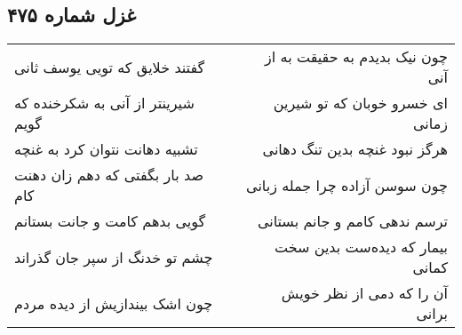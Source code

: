 \begin{center}
\section*{غزل شماره ۴۷۵}
\label{sec:sh475}
\begin{longtable}{l p{0.5cm} r}
گفتند خلایق که تویی یوسف ثانی
&&
چون نیک بدیدم به حقیقت به از آنی
\\
شیرینتر از آنی به شکرخنده که گویم
&&
ای خسرو خوبان که تو شیرین زمانی
\\
تشبیه دهانت نتوان کرد به غنچه
&&
هرگز نبود غنچه بدین تنگ دهانی
\\
صد بار بگفتی که دهم زان دهنت کام
&&
چون سوسن آزاده چرا جمله زبانی
\\
گویی بدهم کامت و جانت بستانم
&&
ترسم ندهی کامم و جانم بستانی
\\
چشم تو خدنگ از سپر جان گذراند
&&
بیمار که دیده‌ست بدین سخت کمانی
\\
چون اشک بیندازیش از دیده مردم
&&
آن را که دمی از نظر خویش برانی
\\
\end{longtable}
\end{center}

